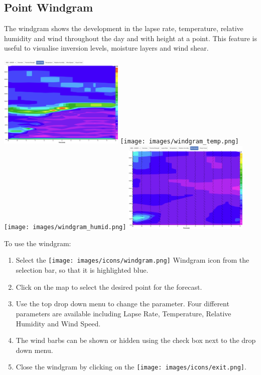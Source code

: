 \documentclass[11pt,a4paper]{article}
\begin{document}
\subsection{Point Windgram}
The windgram shows the development in the lapse rate, temperature, relative humidity and wind throughout the day and with height at a point. This feature is useful to visualise inversion levels, moisture layers and wind shear.
\begin{center}
\includegraphics[width=6cm]{images/windgram_lapse.png}
\texttt{[image: images/windgram\_temp.png]}\\
\texttt{[image: images/windgram\_humid.png]}
\includegraphics[width=6cm]{images/windgram_wind.png}
\end{center}

To use the windgram:
\begin{enumerate}
\item Select the \texttt{[image: images/icons/windgram.png]} Windgram icon from the selection bar, so that it is highlighted blue.
\item Click on the map to select the desired point for the forecast.
\item Use the top drop down menu to change the parameter. Four different parameters are available including Lapse Rate, Temperature, Relative Humidity and Wind Speed.
\item The wind barbs can be shown or hidden using the check box next to the drop down menu.
\item Close the windgram by clicking on the \texttt{[image: images/icons/exit.png]}.
\end{enumerate}
\end{document}
